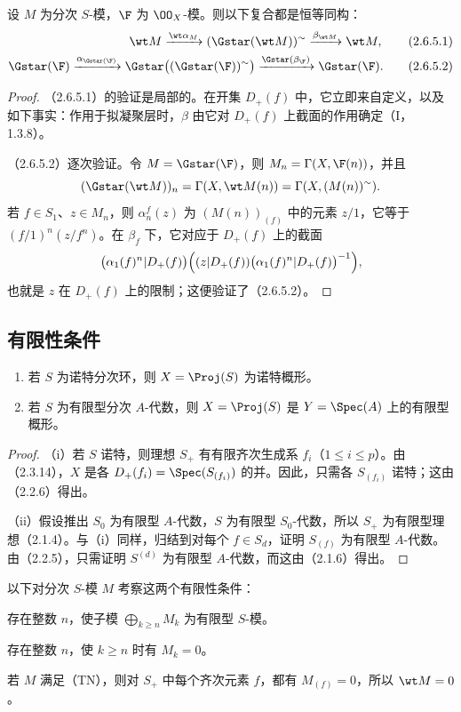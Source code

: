 设 $M$ 为分次 $S$-模，$\F$ 为 $\OO_X$-模。则以下复合都是恒等同构：
\begin{align}
\wt M\xrightarrow{\wt\alpha_M}(\Gstar(\wt M))^\sim
\xrightarrow{\beta_{\wt M}}\wt M,\tag{2.6.5.1}\\
\Gstar(\F)\xrightarrow{\alpha_{\Gstar(\F)}}
\Gstar\bigl((\Gstar(\F))^\sim\bigr)
\xrightarrow{\Gstar(\beta_\F)}\Gstar(\F).\tag{2.6.5.2}
\end{align}
\begin{proof}
（2.6.5.1）的验证是局部的。在开集 $D_+(f)$ 中，它立即来自定义，以及如下事实：作用于拟凝聚层时，$\beta$ 由它对 $D_+(f)$ 上截面的作用确定（I，1.3.8）。

（2.6.5.2）逐次验证。令 $M=\Gstar(\F)$，则
$M_n=\Gamma(X,\F(n))$，并且
\[
(\Gstar(\wt M))_n=\Gamma(X,\wt M(n))
=\Gamma(X,(M(n))^\sim).
\]
若 $f\in S_1$、$z\in M_n$，则 $\alpha_n^f(z)$ 为 $(M(n))_{(f)}$ 中的元素 $z/1$，它等于 $(f/1)^n(z/f^n)$。在 $\beta_f$ 下，它对应于 $D_+(f)$ 上的截面
\[
\bigl(\alpha_1(f)^n|D_+(f)\bigr)
\Bigl((z|D_+(f))\bigl(\alpha_1(f)^n|D_+(f)\bigr)^{-1}\Bigr),
\]
也就是 $z$ 在 $D_+(f)$ 上的限制；这便验证了（2.6.5.2）。
\end{proof}

\subsection{有限性条件}
\begin{enumerate}[label=(\roman*)]
\item 若 $S$ 为诺特分次环，则 $X=\Proj(S)$ 为诺特概形。
\item 若 $S$ 为有限型分次 $A$-代数，则 $X=\Proj(S)$ 是 $Y=\Spec(A)$ 上的有限型概形。
\end{enumerate}
\begin{proof}
（i）若 $S$ 诺特，则理想 $S_+$ 有有限齐次生成系 $f_i$（$1\leq i\leq p$）。由（2.3.14），$X$ 是各
$D_+(f_i)=\Spec(S_{(f_i)})$ 的并。因此，只需各 $S_{(f_i)}$ 诺特；这由（2.2.6）得出。

（ii）假设推出 $S_0$ 为有限型 $A$-代数，$S$ 为有限型 $S_0$-代数，所以 $S_+$ 为有限型理想（2.1.4）。与（i）同样，归结到对每个 $f\in S_d$，证明 $S_{(f)}$ 为有限型 $A$-代数。由（2.2.5），只需证明 $S^{(d)}$ 为有限型 $A$-代数，而这由（2.1.6）得出。
\end{proof}

以下对分次 $S$-模 $M$ 考察这两个有限性条件：
\begin{description}[leftmargin=3.5em,style=nextline]
\item[(TF)] 存在整数 $n$，使子模 $\bigoplus_{k\geq n}M_k$ 为有限型 $S$-模。
\item[(TN)] 存在整数 $n$，使 $k\geq n$ 时有 $M_k=0$。
\end{description}
若 $M$ 满足（TN），则对 $S_+$ 中每个齐次元素 $f$，都有 $M_{(f)}=0$，所以 $\wt M=0$。


